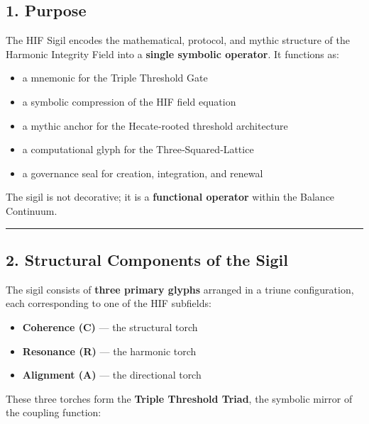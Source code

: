 \subsection{1. Purpose}\label{purpose}

The HIF Sigil encodes the mathematical, protocol, and mythic structure of the Harmonic Integrity Field into a \textbf{single symbolic operator}. It functions as:

\begin{itemize}
\tightlist
\item
  a mnemonic for the Triple Threshold Gate\\
\item
  a symbolic compression of the HIF field equation\\
\item
  a mythic anchor for the Hecate‑rooted threshold architecture\\
\item
  a computational glyph for the Three‑Squared‑Lattice\\
\item
  a governance seal for creation, integration, and renewal
\end{itemize}

The sigil is not decorative; it is a \textbf{functional operator} within the Balance Continuum.

\begin{center}\rule{0.5\linewidth}{0.5pt}\end{center}

\subsection{2. Structural Components of the Sigil}\label{structural-components-of-the-sigil}

The sigil consists of \textbf{three primary glyphs} arranged in a triune configuration, each corresponding to one of the HIF subfields:

\begin{itemize}
\tightlist
\item
  \textbf{Coherence (C)} --- the structural torch\\
\item
  \textbf{Resonance (R)} --- the harmonic torch\\
\item
  \textbf{Alignment (A)} --- the directional torch
\end{itemize}

These three torches form the \textbf{Triple Threshold Triad}, the symbolic mirror of the coupling function:

